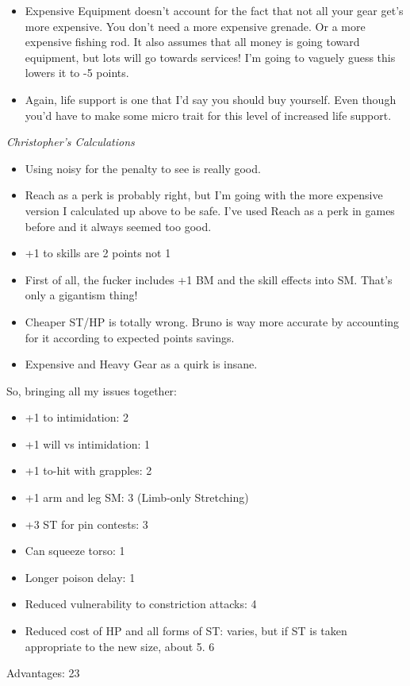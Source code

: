 \begin{multicols*}{2}
\begin{itemize}
		\item Expensive Equipment doesn't account for the fact that not all your gear get's more expensive. You don't need a more expensive grenade. Or a more expensive fishing rod. It also assumes that all money is going toward equipment, but lots will go towards services! I'm going to vaguely guess this lowers it to -5 points.
		\item Again, life support is one that I'd say you should buy yourself. Even though you'd have to make some micro trait for this level of increased life support.
	\end{itemize}

	\textit{Christopher's Calculations}
	\begin{itemize}
		\itemsep 0pt
		\item Using noisy for the penalty to see is really good.
		\item Reach as a perk is probably right, but I'm going with the more expensive version I calculated up above to be safe. I've used Reach as a perk in games before and it always seemed too good.
		\item +1 to skills are 2 points not 1
		\item First of all, the fucker includes +1 BM and the skill effects into SM. That's only a gigantism thing!
		\item Cheaper ST/HP is totally wrong. Bruno is way more accurate by accounting for it according to expected points savings.
		\item Expensive and Heavy Gear as a quirk is insane.
	\end{itemize}
	
	So, bringing all my issues together:
	
	\begin{itemize}
		\itemsep 0pt
		\item 	+1 to intimidation: 2
		\item 	+1 will vs intimidation: 1
		\item 	+1 to-hit with grapples: 2
		\item 	+1 arm and leg SM: 3 (Limb-only Stretching)
		\item 	+3 ST for pin contests: 3
		\item 	Can squeeze torso: 1
		\item 	Longer poison delay: 1
		\item 	Reduced vulnerability to constriction attacks: 4
		\item 	Reduced cost of HP and all forms of ST: varies, but if ST is taken appropriate to the new size, about 5. 6
	\end{itemize}
	Advantages: 23
	

\end{multicols*}
